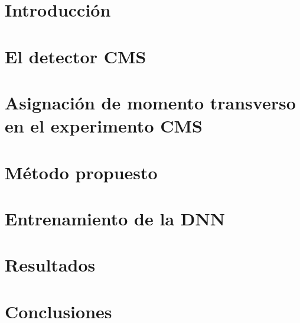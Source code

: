 \documentclass[a4paper,12pt]{article}
\begin{document}
\newpage

\tableofcontents

\newpage

\section{Introducci\'on}\label{sec:intro}



\newpage

\section{El detector CMS}\label{sec:CMS}



\newpage

\section{Asignaci\'on de momento transverso en el experimento CMS}\label{sec:current_assignment}



\newpage

\section{M\'etodo propuesto}\label{sec:methodology}



\newpage

\section{Entrenamiento de la DNN}\label{sec:training}



\newpage

\section{Resultados}\label{sec:results}



\newpage

\section{Conclusiones}\label{sec:conclusions}



\newpage



\end{document}
